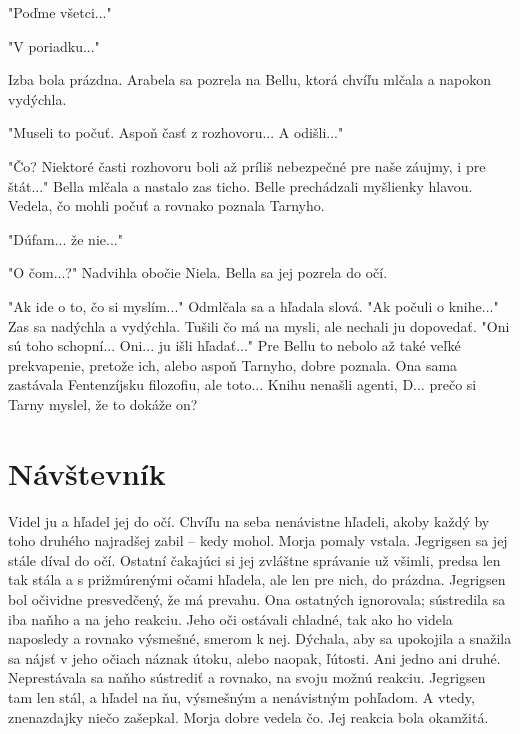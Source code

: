 \documentclass{book}
\begin{document}
"$ $Poďme všetci..."$ $ 

"$ $V poriadku..."$ $ 

Izba bola prázdna. Arabela sa pozrela na Bellu, ktorá chvíľu mlčala a napokon vydýchla.

"$ $Museli to počuť. Aspoň časť z rozhovoru... A odišli..."$ $ 

"$ $Čo? Niektoré časti rozhovoru boli až príliš nebezpečné pre naše záujmy, i pre štát..."$ $  Bella mlčala a nastalo zas ticho. Belle prechádzali myšlienky hlavou. Vedela, čo mohli počuť a rovnako poznala Tarnyho.

"$ $Dúfam... že nie..."$ $ 

"$ $O čom...?"$ $  Nadvihla obočie Niela. Bella sa jej pozrela do očí.

"$ $Ak ide o to, čo si myslím..."$ $  Odmlčala sa a hľadala slová. "$ $Ak počuli o knihe..."$ $  Zas sa nadýchla a vydýchla. Tušili čo má na mysli, ale nechali ju dopovedať. "$ $Oni sú toho schopní... Oni... ju išli hľadať..."$ $  Pre Bellu to nebolo až také veľké prekvapenie, pretože ich, alebo aspoň Tarnyho, dobre poznala. Ona sama zastávala Fentenzíjsku filozofiu, ale toto... Knihu nenašli agenti, D... prečo si Tarny myslel, že to dokáže on?
\chapter{Návštevník}

Videl ju a hľadel jej do očí. Chvíľu na seba nenávistne hľadeli, akoby každý by toho druhého najradšej zabil – kedy mohol. Morja pomaly vstala. Jegrigsen sa jej stále díval do očí. Ostatní čakajúci si jej zvláštne správanie už všimli, predsa len tak stála a s prižmúrenými očami hľadela, ale len pre nich, do prázdna. Jegrigsen bol očividne presvedčený, že má prevahu. Ona ostatných ignorovala; sústredila sa iba naňho a na jeho reakciu. Jeho oči ostávali chladné, tak ako ho videla naposledy a rovnako výsmešné, smerom k nej. Dýchala, aby sa upokojila a snažila sa nájsť v jeho očiach náznak útoku, alebo naopak, ľútosti. Ani jedno ani druhé. Neprestávala sa naňho sústrediť a rovnako, na svoju možnú reakciu. Jegrigsen tam len stál, a hľadel na ňu, výsmešným a nenávistným pohľadom. A vtedy, znenazdajky niečo zašepkal. Morja dobre vedela čo. Jej reakcia bola okamžitá.
\end{document}
